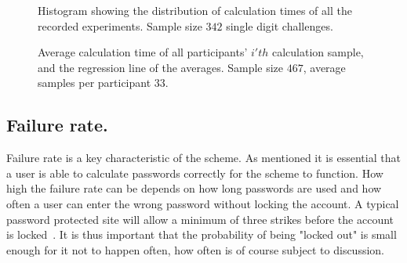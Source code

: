 \begin{figure}
    \centering
    \caption{Histogram showing the distribution of calculation times of all the recorded experiments. Sample size $342$ single digit challenges.}
    \label{histo-calctimes}
\end{figure}


\begin{figure}
    \centering
{}
\caption{Average calculation time of all participants' $i'th$ calculation sample, and the regression line of the averages. Sample size $467$, average samples per participant $33$.}
\label{scatter-regression}
\end{figure}


\subsection{Failure rate.}
Failure rate is a key characteristic of the scheme. As mentioned it is essential that a user is able to calculate passwords correctly for the scheme to function. How high the failure rate can be depends on how long passwords are used and how often a user can enter the wrong password without locking the account. A typical password protected site will allow a minimum of three strikes before the account is locked~\cite{10-strikes}. It is thus important that the probability of being "locked out" is small enough for it not to happen often, how often is of course subject to discussion.

